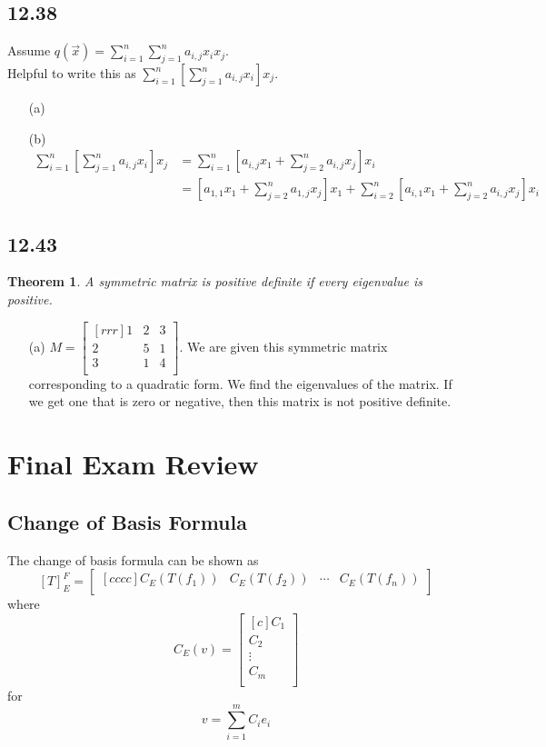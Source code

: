 \documentclass{report}
\newtheorem*{thrm}{Theorem}
\begin{document}
\subsection{12.38}
Assume $q(\vec{x})=\sum_{i=1}^n\sum_{j=1}^na_{i,j}x_ix_j$.\\
Helpful to write this as $\sum_{i=1}^n \left[ \sum_{j=1}^na_{i,j}x_i \right] x_j$.
\begin{enumerate}
\item[(a)]
\item[(b)]
\begin{align*}
\sum_{i=1}^n \left[ \sum_{j=1}^na_{i,j}x_i \right] x_j &= \sum_{i=1}^n\left[ a_{i,j}x_1 + \sum_{j=2}^na_{i,j}x_j\right] x_i\\
&= \left[ a_{1,1}x_1+\sum_{j=2}^n a_{1,j}x_j \right] x_1 + \sum_{i=2}^n \left[ a_{i,1}x_1+\sum_{j=2}^n a_{i,j}x_j\right] x_i
\end{align*}
\end{enumerate}

\subsection{12.43}
\begin{thrm}
A symmetric matrix is positive definite if every eigenvalue is positive.
\end{thrm}
\begin{enumerate}
\item[(a)]$M=\begin{bmatrix}[rrr]1&2&3\\2&5&1\\3&1&4\\\end{bmatrix}$. We are given this symmetric matrix corresponding to a quadratic form. We find the eigenvalues of the matrix. If we get one that is zero or negative, then this matrix is not positive definite.
\end{enumerate}

\section{Final Exam Review}
\subsection{Change of Basis Formula}
The change of basis formula can be shown as
\[ [T]_E^F = \begin{bmatrix}[cccc]C_E(T(f_1)) & C_E(T(f_2)) & \cdots & C_E(T(f_n))\\\end{bmatrix} \]
where
\[ C_E(v) = \begin{bmatrix}[c]C_1\\C_2\\\vdots\\C_m\\\end{bmatrix} \]
for
\[ v=\sum_{i=1}^mC_ie_i \]
\end{document}
